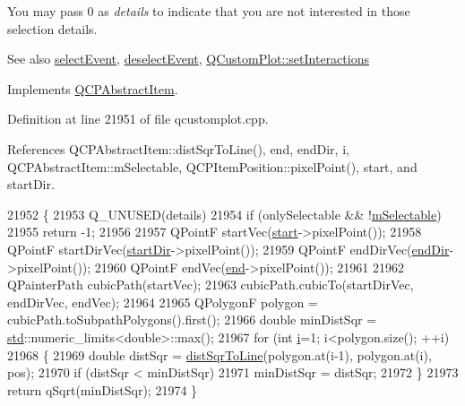 You may pass 0 as {\itshape details} to indicate that you are not interested in those selection details.

\begin{DoxySeeAlso}{See also}
\hyperlink{class_q_c_p_abstract_item_aaf92af7b9893712959a6c073d334d88d}{select\+Event}, \hyperlink{class_q_c_p_abstract_item_a91f090d6763cfedb0749219c63788ae9}{deselect\+Event}, \hyperlink{class_q_custom_plot_a5ee1e2f6ae27419deca53e75907c27e5}{Q\+Custom\+Plot\+::set\+Interactions} 
\end{DoxySeeAlso}


Implements \hyperlink{class_q_c_p_abstract_item_a96d522d10ffc0413b9a366c6f7f0476b}{Q\+C\+P\+Abstract\+Item}.



Definition at line 21951 of file qcustomplot.\+cpp.



References Q\+C\+P\+Abstract\+Item\+::dist\+Sqr\+To\+Line(), end, end\+Dir, i, Q\+C\+P\+Abstract\+Item\+::m\+Selectable, Q\+C\+P\+Item\+Position\+::pixel\+Point(), start, and start\+Dir.


\begin{DoxyCode}
21952 \{
21953   Q\_UNUSED(details)
21954   if (onlySelectable && !\hyperlink{class_q_c_p_abstract_item_ad81eb35c8726a0f458db9df9732e0e41}{mSelectable})
21955     return -1;
21956   
21957   QPointF startVec(\hyperlink{class_q_c_p_item_curve_a20c3b5ea31c33764f4f30c2ec7ae518b}{start}->pixelPoint());
21958   QPointF startDirVec(\hyperlink{class_q_c_p_item_curve_aa124bf66c09cc51c627fb49db8bf8a7b}{startDir}->pixelPoint());
21959   QPointF endDirVec(\hyperlink{class_q_c_p_item_curve_a28181a9dee9cc3c3da83a883221bd2d0}{endDir}->pixelPoint());
21960   QPointF endVec(\hyperlink{class_q_c_p_item_curve_a24ecbb195b32a08b42b61c2cf08a1b4d}{end}->pixelPoint());
21961 
21962   QPainterPath cubicPath(startVec);
21963   cubicPath.cubicTo(startDirVec, endDirVec, endVec);
21964   
21965   QPolygonF polygon = cubicPath.toSubpathPolygons().first();
21966   \textcolor{keywordtype}{double} minDistSqr = \hyperlink{namespacestd}{std}::numeric\_limits<\textcolor{keywordtype}{double}>::max();
21967   for (\textcolor{keywordtype}{int} \hyperlink{_comparision_pictures_2_createtest_image_8m_a6f6ccfcf58b31cb6412107d9d5281426}{i}=1; i<polygon.size(); ++i)
21968   \{
21969     \textcolor{keywordtype}{double} distSqr = \hyperlink{class_q_c_p_abstract_item_acdca343717d625b8abb3c3e38c0ed39d}{distSqrToLine}(polygon.at(i-1), polygon.at(i), pos);
21970     \textcolor{keywordflow}{if} (distSqr < minDistSqr)
21971       minDistSqr = distSqr;
21972   \}
21973   \textcolor{keywordflow}{return} qSqrt(minDistSqr);
21974 \}
\end{DoxyCode}


